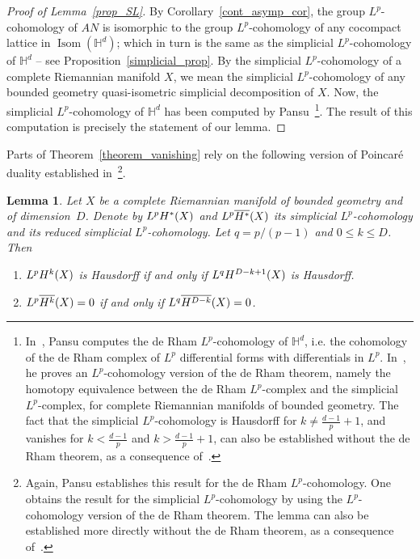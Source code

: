 \documentclass[11pt]{article}
\newtheorem{lemm}[theo]{Lemma}
\theoremstyle{definition}
\numberwithin{equation}{section}
\numberwithin{figure}{section}
\numberwithin{table}{section}
\newcommand{\Isom}{\mathop{\mathrm{Isom}}\nolimits}
\begin{document}
\begin{proof}[Proof of Lemma~\ref{prop_SL}]
By Corollary~\ref{cont_asymp_cor}, the group $L^p$-cohomology of $AN$ is isomorphic to the group $L^p$-cohomology of any cocompact lattice in $\Isom (\mathbb {H}^d)$; which in turn is the same as the simplicial $L^p$-cohomology of $\mathbb H ^d$ -- see Proposition~\ref{simplicial_prop}. By the simplicial $L^p$-cohomology of a complete Riemannian manifold $X$, we mean the simplicial $L^p$-cohomology of any bounded geometry quasi-isometric simplicial decomposition of $X$. Now, the simplicial $L^p$-cohomology of $\mathbb H ^d$ has been computed by Pansu~\cite{P1,Pa99}\footnote{In~\cite{P1,Pa99}, Pansu computes the de Rham $L^p$-cohomology of $\mathbb H ^d$, i.e. the cohomology of the de Rham complex of $L^p$ differential forms with differentials in $L^p$. In~\cite{Pa95}, he proves an $L^p$-cohomology version of the de Rham theorem, namely the homotopy equivalence between the de Rham $L^p$-complex and the simplicial $L^p$-complex, for complete Riemannian manifolds of bounded geometry. The fact that the simplicial $L^p$-cohomology is Hausdorff for $k\neq \frac{d-1}{p} +1$, and vanishes for $k < \frac{d-1}{p}$ and $k > \frac{d-1}{p}+1$, can also be established without the de Rham theorem, as a consequence of~\cite[Corollary~B]{B16}.}. The result of this computation is precisely the statement of our lemma.
\end{proof}

Parts of Theorem~\ref{theorem_vanishing} rely on the following version of Poincaré duality established in~\cite[Corollaire~14]{P1}\footnote{Again, Pansu establishes this result for the de Rham $L^p$-cohomology. One obtains the result for the simplicial $L^p$-cohomology by using the $L^p$-cohomology version of the de Rham theorem. The lemma can also be established more directly without the de Rham theorem, as a consequence of~\cite[Proposition~1.2 and Theorem~1.3]{B16}.}.


\begin{lemm}\label{lemma_duality}
Let $X$ be a complete Riemannian manifold of bounded geometry and of dimension~$D$.
Denote by $L^p {\rm H}^* (X)$ and $L^p \overline{{\rm H}^*} (X)$ its simplicial $L^p$-cohomology and its reduced simplicial $L^p$-cohomology. Let $q = p/(p-1)$ and $0 \leqslant k \leqslant D$. Then
\begin{enumerate}
\item \label{list6.3.1}$L^p {\rm H}^k (X)$ is Hausdorff if and only if $L^q {\rm H}^{D-k +1} (X)$ is Hausdorff.
\item \label{list6.3.2}$L^p \overline{{\rm H}^k} (X) = 0$ if and only if $L^q \overline{{\rm H}^{D-k}} (X) = 0$.
\end{enumerate}
\end{lemm}
\end{document}
